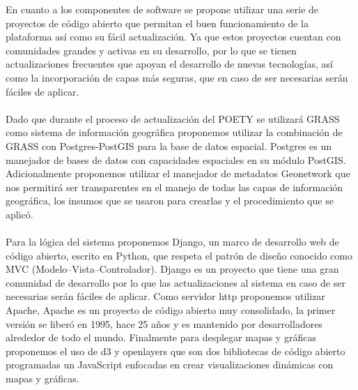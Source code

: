 \documentclass[a4paper]{report}
\begin{document}
En cuanto a los componentes de software se propone utilizar una serie de proyectos de código abierto que permitan el buen funcionamiento de la plataforma así como su fácil actualización. Ya que estos proyectos cuentan con comunidades grandes y activas en su desarrollo, por lo que se tienen actualizaciones frecuentes que apoyan el desarrollo de nuevas tecnologías, así como la incorporación de capas más seguras, que en caso de ser necesarias serán fáciles de aplicar.
\\
\\
Dado que durante el proceso de actualización del POETY se utilizará GRASS como sistema de información geográfica proponemos utilizar la combinación de GRASS con Postgres-PostGIS para la base de datos espacial. Postgres es un manejador de bases de datos con capacidades espaciales en su módulo PostGIS.  Adicionalmente proponemos utilizar el manejador de metadatos Geonetwork que nos permitirá ser transparentes en el manejo de todas las capas de información geográfica, los insumos que se usaron para crearlas y el procedimiento que se aplicó.
\\
\\
Para la lógica del sistema proponemos Django, un marco de desarrollo web de código abierto, escrito en Python, que respeta el patrón de diseño conocido como MVC (Modelo–Vista–Controlador). Django es un proyecto que tiene una gran comunidad de desarrollo por lo que las actualizaciones al sistema en caso de ser necesarias serán fáciles de aplicar.  Como servidor http proponemos utilizar Apache, Apache es un proyecto de código abierto muy consolidado, la primer versión se liberó en 1995, hace 25 años y es mantenido por desarrolladores alrededor de todo el mundo. Finalmente para desplegar mapas y gráficas proponemos el uso de d3 y openlayers que son dos bibliotecas de código abierto programadas un JavaScript enfocadas en crear visualizaciones dinámicas con mapas y gráficas.
\end{document}
